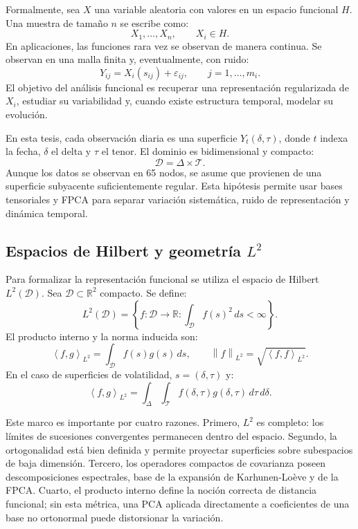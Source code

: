 \documentclass[a4paper,11pt]{article}
\newcommand{\R}{\mathbb{R}}
\newcommand{\norm}[1]{\left\lVert #1 \right\rVert}
\newcommand{\inner}[2]{\left\langle #1,#2 \right\rangle}
\begin{document}
Formalmente, sea \(X\) una variable aleatoria con valores en un espacio funcional \(H\). Una muestra de tamaño \(n\) se escribe como:
\[
  X_1,\ldots,X_n,\qquad X_i\in H.
\]
En aplicaciones, las funciones rara vez se observan de manera continua. Se observan en una malla finita y, eventualmente, con ruido:
\[
  Y_{ij}=X_i(s_{ij})+\varepsilon_{ij},
  \qquad j=1,\ldots,m_i.
\]
El objetivo del análisis funcional es recuperar una representación regularizada de \(X_i\), estudiar su variabilidad y, cuando existe estructura temporal, modelar su evolución.

En esta tesis, cada observación diaria es una superficie \(Y_t(\delta,\tau)\), donde \(t\) indexa la fecha, \(\delta\) el delta y \(\tau\) el tenor. El dominio es bidimensional y compacto:
\[
  \mathcal{D}=\Delta\times \mathcal{T}.
\]
Aunque los datos se observan en 65 nodos, se asume que provienen de una superficie subyacente suficientemente regular. Esta hipótesis permite usar bases tensoriales y FPCA para separar variación sistemática, ruido de representación y dinámica temporal.

\subsection{Espacios de Hilbert y geometría \(L^2\)}

Para formalizar la representación funcional se utiliza el espacio de Hilbert \(L^2(\mathcal{D})\). Sea \(\mathcal{D}\subset\R^2\) compacto. Se define:
\[
  L^2(\mathcal{D})=
  \left\{
  f:\mathcal{D}\to\R:
  \int_{\mathcal{D}} f(s)^2\,ds<\infty
  \right\}.
\]
El producto interno y la norma inducida son:
\[
  \inner{f}{g}_{L^2}=\int_{\mathcal{D}} f(s)g(s)\,ds,
  \qquad
  \norm{f}_{L^2}=\sqrt{\inner{f}{f}_{L^2}}.
\]
En el caso de superficies de volatilidad, \(s=(\delta,\tau)\) y:
\[
  \inner{f}{g}_{L^2}
  =
  \int_{\Delta}\int_{\mathcal{T}}
  f(\delta,\tau)g(\delta,\tau)\,d\tau\,d\delta.
\]

Este marco es importante por cuatro razones. Primero, \(L^2\) es completo: los límites de sucesiones convergentes permanecen dentro del espacio. Segundo, la ortogonalidad está bien definida y permite proyectar superficies sobre subespacios de baja dimensión. Tercero, los operadores compactos de covarianza poseen descomposiciones espectrales, base de la expansión de Karhunen-Loève y de la FPCA. Cuarto, el producto interno define la noción correcta de distancia funcional; sin esta métrica, una PCA aplicada directamente a coeficientes de una base no ortonormal puede distorsionar la variación.
\end{document}
